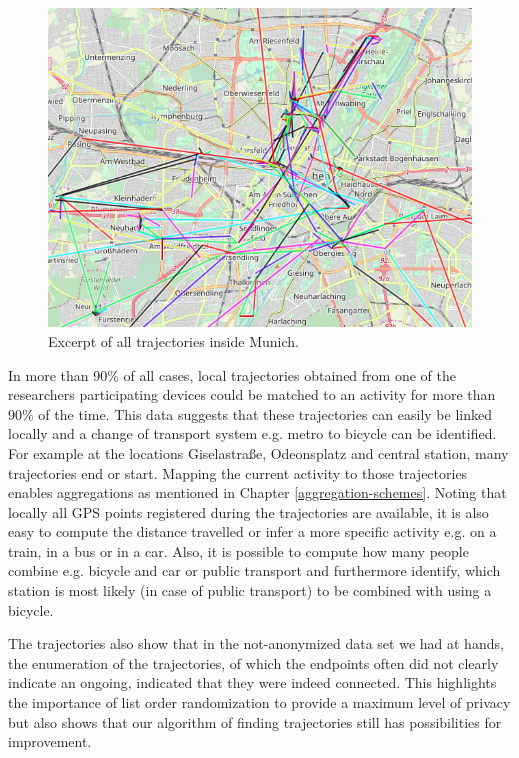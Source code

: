 \begin{figure}[h!]
	\includegraphics[width=\textwidth]{data/trajectories-3.png}
	\caption{Excerpt of all trajectories inside Munich.}
	\label{trajectories2}
\end{figure}

In more than 90\% of all cases, local trajectories obtained from one of the researchers participating devices could be matched to an activity for more than 90\% of the time. This data suggests that these trajectories can easily be linked locally and a change of transport system e.g. metro to bicycle can be identified. For example at the locations Giselastraße, Odeonsplatz and central station, many trajectories end or start. Mapping the current activity to those trajectories enables aggregations as mentioned in Chapter \ref{aggregation-schemes}. Noting that locally all GPS points registered during the trajectories are available, it is also easy to compute the distance travelled or infer a more specific activity e.g. on a train, in a bus or in a car. Also, it is possible to compute how many people combine e.g. bicycle and car or public transport and furthermore identify, which station is most likely (in case of public transport) to be combined with using a bicycle.

The trajectories also show that in the not-anonymized data set we had at hands, the enumeration of the trajectories, of which the endpoints often did not clearly indicate an ongoing, indicated that they were indeed connected. This highlights the importance of list order randomization to provide a maximum level of privacy but also shows that our algorithm of finding trajectories still has possibilities for improvement.

